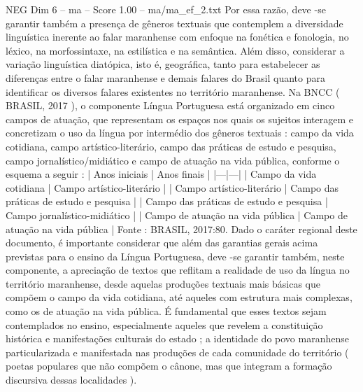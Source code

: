 \begin{textsample}{NEG Dim 6 – ma – Score 1.00 – ma/ma\_ef\_2.txt}
Por essa razão, deve -se garantir também a presença de gêneros textuais que contemplem a diversidade linguística inerente ao falar maranhense com enfoque na fonética e fonologia, no léxico, na morfossintaxe, na estilística e na semântica.
Além disso, considerar a variação linguística diatópica, isto é, geográfica, tanto para estabelecer as diferenças entre o falar maranhense e demais falares do Brasil quanto para identificar os diversos falares existentes no território maranhense.
Na BNCC ( BRASIL, 2017 ), o componente Língua Portuguesa está organizado em cinco campos de atuação, que representam os espaços nos quais os sujeitos interagem e concretizam o uso da língua por intermédio dos gêneros textuais : campo da vida cotidiana, campo artístico-literário, campo das práticas de estudo e pesquisa, campo jornalístico/midiático e campo de atuação na vida pública, conforme o esquema a seguir : | Anos iniciais | Anos finais | |---|---| | Campo da vida cotidiana | Campo artístico-literário | | Campo artístico-literário | Campo das práticas de estudo e pesquisa | | Campo das práticas de estudo e pesquisa | Campo jornalístico-midiático | | Campo de atuação na vida pública | Campo de atuação na vida pública | Fonte : BRASIL, 2017:80.
Dado o caráter regional deste documento, é importante considerar que além das garantias gerais acima previstas para o ensino da Língua Portuguesa, deve -se garantir também, neste componente, a apreciação de textos que reflitam a realidade de uso da língua no território maranhense, desde aquelas produções textuais mais básicas que compõem o campo da vida cotidiana, até aqueles com estrutura mais complexas, como os de atuação na vida pública.
É fundamental que esses textos sejam contemplados no ensino, especialmente aqueles que revelem a constituição histórica e manifestações culturais do estado ; a identidade do povo maranhense particularizada e manifestada nas produções de cada comunidade do território ( poetas populares que não compõem o cânone, mas que integram a formação discursiva dessas localidades ).

\end{textsample}
